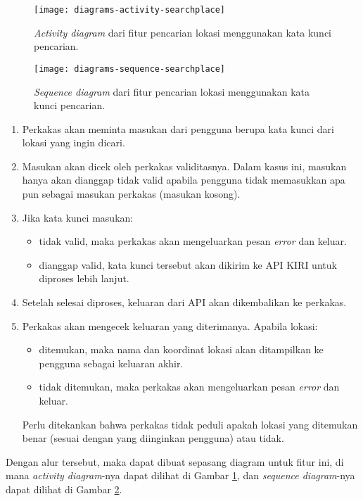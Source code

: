 \begin{figure}[h]
    \centering
    \texttt{[image: diagrams-activity-searchplace]}
    \caption[\textit{Activity diagram} fitur pencarian lokasi menggunakan kata kunci lokasi]{\textit{Activity diagram} dari fitur pencarian lokasi menggunakan kata kunci pencarian.}
    \label{fig:diagrams-activity-searchplace}
\end{figure}

\begin{figure}[h]
    \centering
    \texttt{[image: diagrams-sequence-searchplace]}
    \caption[\textit{Sequence diagram} fitur pencarian lokasi menggunakan kata kunci lokasi]{\textit{Sequence diagram} dari fitur pencarian lokasi menggunakan kata kunci pencarian.}
    \label{fig:diagrams-sequence-searchplace}
\end{figure}

\begin{enumerate}
	\item Perkakas akan meminta masukan dari pengguna berupa kata kunci dari lokasi yang ingin dicari.
	\item Masukan akan dicek oleh perkakas validitasnya. Dalam kasus ini, masukan hanya akan dianggap tidak valid apabila pengguna tidak memasukkan apa pun sebagai masukan perkakas (masukan kosong).
	\item Jika kata kunci masukan:

	\begin{itemize}
		\item tidak valid, maka perkakas akan mengeluarkan pesan \textit{error} dan keluar.
		\item dianggap valid, kata kunci tersebut akan dikirim ke API KIRI untuk diproses lebih lanjut.
	\end{itemize}
	
	\item Setelah selesai diproses, keluaran dari API akan dikembalikan ke perkakas.
	\item Perkakas akan mengecek keluaran yang diterimanya. Apabila lokasi:
	
	\begin{itemize}
		\item ditemukan, maka nama dan koordinat \latlon\xspace lokasi akan ditampilkan ke pengguna sebagai keluaran akhir.
		\item tidak ditemukan, maka perkakas akan mengeluarkan pesan \textit{error} dan keluar.
	\end{itemize}
	
	Perlu ditekankan bahwa perkakas tidak peduli apakah lokasi yang ditemukan benar (sesuai dengan yang diinginkan pengguna) atau tidak.
	
\end{enumerate}
\noindent
Dengan alur tersebut, maka dapat dibuat sepasang diagram untuk fitur ini, di mana \textit{activity diagram}-nya dapat dilihat di Gambar \ref{fig:diagrams-activity-searchplace}, dan \textit{sequence diagram}-nya dapat dilihat di Gambar \ref{fig:diagrams-sequence-searchplace}.
\newpage\vspace*{-3em} %
